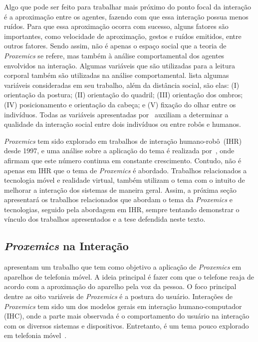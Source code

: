 Algo que pode ser feito para trabalhar mais próximo do ponto focal da interação é a aproximação entre os agentes, fazendo com que essa interação possua menos ruídos. Para que essa aproximação ocorra com sucesso, alguns fatores são importantes, como velocidade de aproximação, gestos e ruídos emitidos, entre outros fatores. Sendo assim, não é apenas o espaço social que a teoria de \emph{Proxemics} se refere, mas também à análise comportamental dos agentes envolvidos na interação. Algumas variáveis que são utilizadas para a leitura corporal também são utilizadas na análise comportamental. \textcite{mead:2013} lista algumas variáveis consideradas em seu trabalho, além da distância social, são elas: (I) orientação da postura; (II) orientação do quadril; (III) orientação dos ombros; (IV) posicionamento e orientação da cabeça; e (V) fixação do olhar entre os indivíduos. Todas as variáveis apresentadas por~\textcite{mead:2013} auxiliam a determinar a qualidade da interação social entre dois indivíduos ou entre robôs e humanos.

\emph{Proxemics} tem sido explorado em trabalhos de interação humano-robô~(IHR) desde 1997, e uma análise sobre a aplicação do tema é realizada por~\textcite{henkel:2014}, onde afirmam que este número continua em constante crescimento. Contudo, não é apenas em IHR que o tema de \emph{Proxemics} é abordado. Trabalhos relacionados a tecnologia móvel e realidade virtual, também utilizam o tema com o intuito de melhorar a interação dos sistemas de maneira geral. Assim, a próxima seção apresentará os trabalhos relacionados que abordam o tema da \emph{Proxemics} e tecnologias, seguido pela abordagem em IHR, sempre tentando demonstrar o vínculo dos trabalhos apresentados e a tese defendida neste texto.

\subsection{\emph{Proxemics} na Interação}
\label{sec:proxemicsihr}
\textcite{hemmert:2013} apresentam um trabalho que tem como objetivo a aplicação de \emph{Proxemics} em aparelhos de telefonia móvel. A ideia principal é fazer com que o telefone reaja de acordo com a aproximação do aparelho pela voz da pessoa. O foco principal dentre as oito variáveis de \emph{Proxemics} é a postura do usuário. Interações de \emph{Proxemics} tem sido um dos modelos gerais em interação humano-computador (IHC), onde a parte mais observada é o comportamento do usuário na interação com os diversos sistemas e dispositivos. Entretanto, é um tema pouco explorado em telefonia móvel~\cite{hemmert:2013}.


